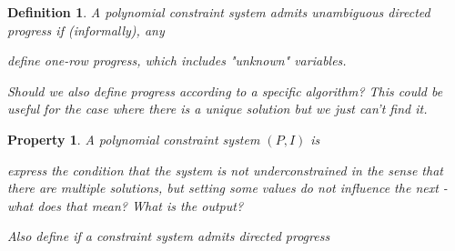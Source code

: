 \documentclass[11pt,letterpaper]{article}
\newtheorem{definition}[dummytheorem]{Definition}
\newtheorem{property}[dummytheorem]{Property}
\begin{document}
\begin{definition}
A polynomial constraint system admits \emph{unambiguous directed progress} if
(informally), any 

define one-row progress, which includes "unknown" variables.

Should we also define progress according to a specific algorithm? This could be useful
for the case where there is a unique solution but we just can't find it.
\end{definition}

\begin{property}
A polynomial constraint system $(P, I)$ is \emph{}

express the condition that the system is not underconstrained in the sense that there are multiple solutions,
but setting some values do not influence the next - what does that mean? What is the output?

Also define if a constraint system admits directed progress
\end{property}
\end{document}
